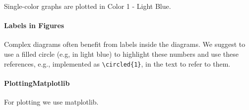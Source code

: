 \documentclass[sigplan,\review anonymous]{acmart}
\newenvironment{draftonly}{}{}
\newcommand*\circled[1]{\tikz[baseline=(char.base)]{
            \node[shape=circle,fill=pairedOneLightBlue,inner sep=1pt] (char) {#1};}}
\begin{document}
\begin{draftonly}
Single-color graphs are plotted in Color 1 - Light Blue.

\paragraph{Labels in Figures}
Complex diagrams often benefit from labels inside the diagrams. We suggest to
use a filled circle (e.g, in light blue) to highlight these numbers and use
these references, e.g., \circled{1} implemented as \texttt{\textbackslash{}circled\{1\}}, in the text to refer to them.

\paragraph{PlottingMatplotlib}
For plotting we use matplotlib.
\end{draftonly}
\end{document}
